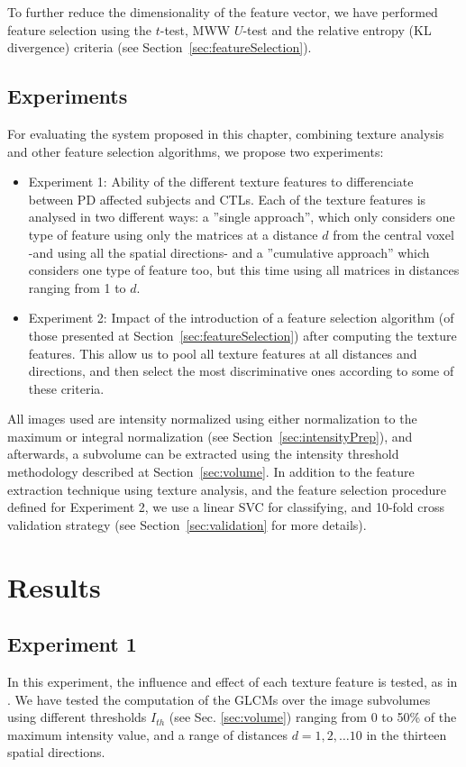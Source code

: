 To further reduce the dimensionality of the feature vector, we have performed feature selection using the $t$-test, \ac{MWW} $U$-test and the relative entropy (\ac{KL} divergence) criteria (see Section~\ref{sec:featureSelection}). 

\subsection{Experiments}
For evaluating the system proposed in this chapter, combining texture analysis and other feature selection algorithms, we propose two experiments: 
\begin{itemize}
	\item Experiment 1: Ability of the different texture features to differenciate between \ac{PD} affected subjects and \acp{CTL}. Each of the texture features is analysed in two different ways: a ''single approach'', which only considers one type of feature using only the matrices at a distance $d$ from the central voxel -and using all the spatial directions- and a ''cumulative approach'' which considers one type of feature too, but this time using all matrices in distances ranging from 1 to $d$. 
	\item Experiment 2: Impact of the introduction of a feature selection algorithm (of those presented at Section~\ref{sec:featureSelection}) after computing the texture features. This allow us to pool all texture features at all distances and directions, and then select the most discriminative ones according to some of these criteria.  
\end{itemize}

All images used are intensity normalized using either normalization to the maximum or integral normalization (see Section~\ref{sec:intensityPrep}), and afterwards, a subvolume can be extracted using the intensity threshold methodology described at Section~\ref{sec:volume}. In addition to the feature extraction technique using texture analysis, and the feature selection procedure defined for Experiment 2, we use a linear \ac{SVC} for classifying, and 10-fold cross validation strategy (see Section~\ref{sec:validation} for more details). 

\section{Results}\label{sec:ch5results}
\subsection{Experiment 1}
In this experiment, the influence and effect of each texture feature is tested, as in \cite{Martinez-Murcia2013266}. We have tested the computation of the \acp{GLCM} over the image subvolumes using different thresholds $I_{th}$ (see Sec. \ref{sec:volume}) ranging from 0 to 50\% of the maximum intensity value, and a range of distances $d=1,2,\dots10$ in the thirteen spatial directions.

